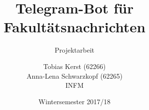 \title{Telegram-Bot für Fakultätsnachrichten}%
\subtitle{Projektarbeit}
\author{%
	Tobias Kerst (62266) \\
  Anna-Lena Schwarzkopf (62265) \\
  INFM
}
\date{Wintersemester 2017/18}
\publishers{
    \textbf{Professor:} Prof. Dr. rer. nat. Peter A. Henning
}
\maketitle

\clearpage
